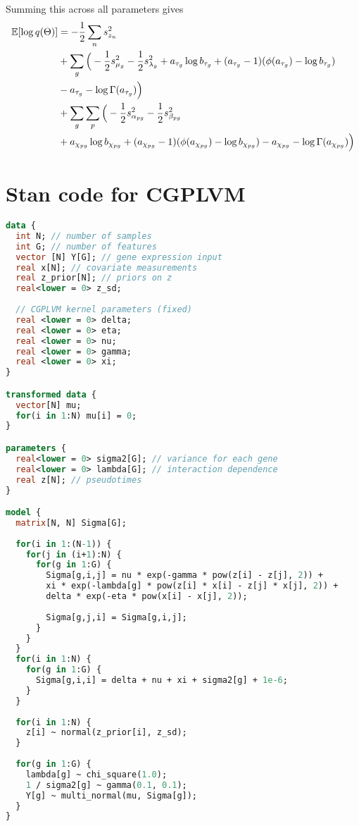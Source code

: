 Summing this across all parameters gives
\begin{equation}
\begin{aligned}
\mathbb{E}[\log q(\Theta)] &= -\frac{1}{2} \sum_n s_{z_n}^2 \\
& + \sum_g \Big(- \frac{1}{2} s_{\mu_g}^2 - \frac{1}{2} s_{\lambda_g}^2 +
a_{\tau_g} \log b_{\tau_g} + (a_{\tau_g} - 1)(\phi(a_{\tau_g}) - \log b_{\tau_g})  \\
& - a_{\tau_g} - \log \Gamma(a_{\tau_g}) \Big) \\
& + \sum_g \sum_p \Big(
-\frac{1}{2} s_{\alpha_{pg}}^2 - \frac{1}{2} s_{\beta_{pg}}^2 \\
& + a_{\chi_{pg}} \log b_{\chi_{pg}} + (a_{\chi_{pg}} - 1)(\phi(a_{\chi_{pg}}) - \log b_{\chi_{pg}}) - a_{\chi_{pg}} - \log \Gamma(a_{\chi_{pg}})\Big)
\end{aligned}
\end{equation}


\section{Stan code for CGPLVM}

\begin{lstlisting}[language=Stan]
data {
  int N; // number of samples
  int G; // number of features
  vector [N] Y[G]; // gene expression input
  real x[N]; // covariate measurements
  real z_prior[N]; // priors on z
  real<lower = 0> z_sd;
  
  // CGPLVM kernel parameters (fixed)
  real <lower = 0> delta;
  real <lower = 0> eta;
  real <lower = 0> nu;
  real <lower = 0> gamma;
  real <lower = 0> xi;
}

transformed data {
  vector[N] mu;
  for(i in 1:N) mu[i] = 0;
}

parameters {
  real<lower = 0> sigma2[G]; // variance for each gene
  real<lower = 0> lambda[G]; // interaction dependence
  real z[N]; // pseudotimes
}

model {
  matrix[N, N] Sigma[G];
  
  for(i in 1:(N-1)) {
    for(j in (i+1):N) {
      for(g in 1:G) {
        Sigma[g,i,j] = nu * exp(-gamma * pow(z[i] - z[j], 2)) + 
        xi * exp(-lambda[g] * pow(z[i] * x[i] - z[j] * x[j], 2)) +
        delta * exp(-eta * pow(x[i] - x[j], 2));
        
        Sigma[g,j,i] = Sigma[g,i,j];
      }
    }
  }
  for(i in 1:N) {
    for(g in 1:G) {
      Sigma[g,i,i] = delta + nu + xi + sigma2[g] + 1e-6;
    }
  }
  
  for(i in 1:N) {
    z[i] ~ normal(z_prior[i], z_sd);
  }
  
  for(g in 1:G) {
    lambda[g] ~ chi_square(1.0);
    1 / sigma2[g] ~ gamma(0.1, 0.1);
    Y[g] ~ multi_normal(mu, Sigma[g]);
  }
}
\end{lstlisting}
